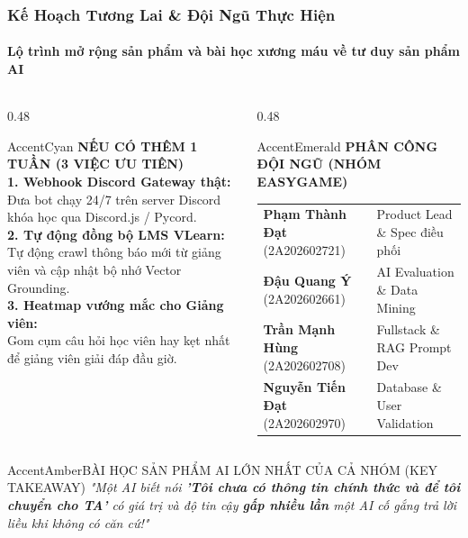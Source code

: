 \documentclass[aspectratio=169,10pt]{beamer}
\begin{document}
\begin{frame}
  \frametitle{Kế Hoạch Tương Lai \& Đội Ngũ Thực Hiện}
  \framesubtitle{Lộ trình mở rộng sản phẩm và bài học xương máu về tư duy sản phẩm AI}

  \begin{columns}[T]
    \begin{column}{0.48\textwidth}
      \begin{glassbox}{AccentCyan}
        {\scriptsize \textbf{\color{AccentCyan}NẾU CÓ THÊM 1 TUẦN (3 VIỆC ƯU TIÊN)}}\\[0.15cm]
        \tiny
        \textbf{1. Webhook Discord Gateway thật:}\\
        Đưa bot chạy 24/7 trên server Discord khóa học qua Discord.js / Pycord.\\[0.15cm]
        \textbf{2. Tự động đồng bộ LMS VLearn:}\\
        Tự động crawl thông báo mới từ giảng viên và cập nhật bộ nhớ Vector Grounding.\\[0.15cm]
        \textbf{3. Heatmap vướng mắc cho Giảng viên:}\\
        Gom cụm câu hỏi học viên hay kẹt nhất để giảng viên giải đáp đầu giờ.
      \end{glassbox}
    \end{column}

    \begin{column}{0.48\textwidth}
      \begin{glassbox}{AccentEmerald}
        {\scriptsize \textbf{\color{AccentEmerald}PHÂN CÔNG ĐỘI NGŨ (NHÓM EASYGAME)}}\\[0.1cm]
        \tiny
        \renewcommand{\arraystretch}{1.2}
        \begin{tabularx}{\textwidth}{p{2.8cm}p{3.2cm}}
          \textbf{Phạm Thành Đạt} (2A202602721) & Product Lead \& Spec điều phối\\
          \textbf{Đậu Quang Ý} (2A202602661) & AI Evaluation \& Data Mining\\
          \textbf{Trần Mạnh Hùng} (2A202602708) & Fullstack \& RAG Prompt Dev\\
          \textbf{Nguyễn Tiến Đạt} (2A202602970) & Database \& User Validation\\
        \end{tabularx}
      \end{glassbox}
    \end{column}
  \end{columns}

  \vspace{0.2cm}
  \begin{calloutbox}{AccentAmber}{BÀI HỌC SẢN PHẨM AI LỚN NHẤT CỦA CẢ NHÓM (KEY TAKEAWAY)}
    \footnotesize\centering
    \textit{"Một AI biết nói \textbf{'Tôi chưa có thông tin chính thức và để tôi chuyển cho TA'} có giá trị và độ tin cậy \textbf{gấp nhiều lần} một AI cố gắng trả lời liều khi không có căn cứ!"}
  \end{calloutbox}
\end{frame}
\end{document}
